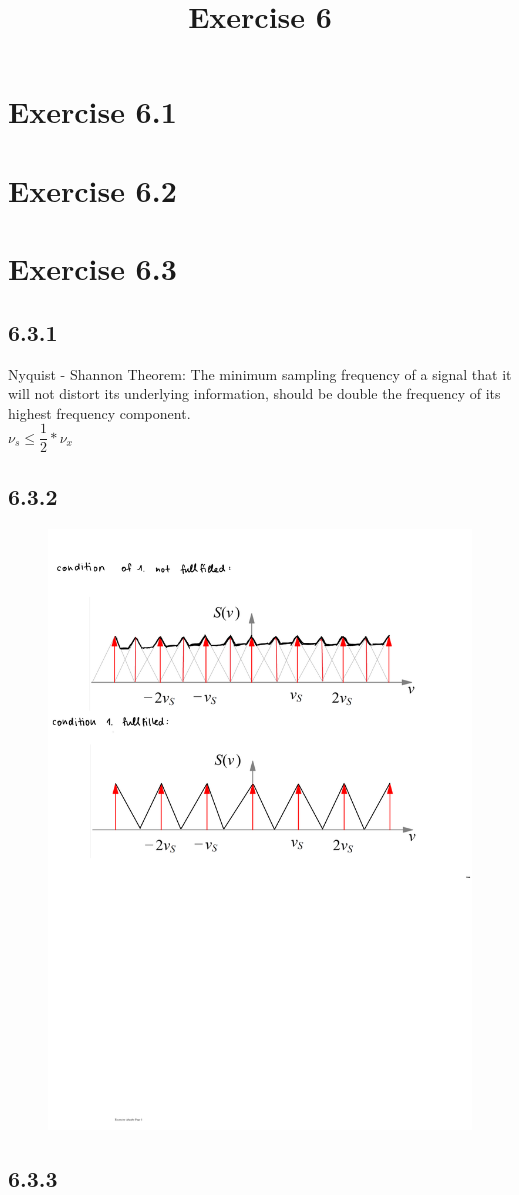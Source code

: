 \documentclass[a4paper]{article}
\date{}
\author{}
\title{Exercise 6}
\begin{document}
\maketitle 
\thispagestyle{fancy}


\section*{Exercise 6.1}


\section*{Exercise 6.2}


\section*{Exercise 6.3}

\subsection*{6.3.1}
Nyquist - Shannon Theorem:
The minimum sampling frequency of a signal that it will not distort its underlying information, should be double the frequency of its highest frequency component.\\
$ \nu_s \leq \dfrac{1}{2} * \nu_x $

\newpage
\subsection*{6.3.2}
\begin{figure}[!ht]
	\centering
	\includegraphics[width=0.79\linewidth]{6_3_2.pdf}
	\label{fig:delaunay}
\end{figure}

\subsection*{6.3.3}
\end{document}
